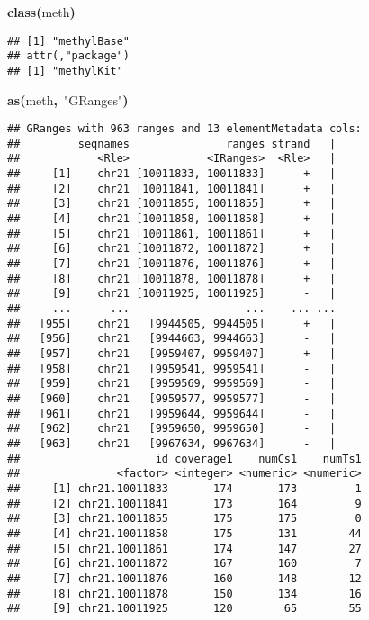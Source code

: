 \documentclass{article}
\makeatletter
\newcommand{\hlfunctioncall}[1]{\textcolor[rgb]{.5,0,.33}{\textbf{#1}}}%
\newcommand{\hlstring}[1]{\textcolor[rgb]{.6,.6,1}{#1}}%
\newcommand{\hlkeyword}[1]{\textbf{#1}}%
\newcommand{\hlsymbol}[1]{#1}%
\newenvironment{kframe}{%
 \def\FrameCommand##1{\hskip\@totalleftmargin \hskip-\fboxsep
 \colorbox{shadecolor}{##1}\hskip-\fboxsep
     \hskip-\linewidth \hskip-\@totalleftmargin \hskip\columnwidth}%
 \MakeFramed {\advance\hsize-\width
   \@totalleftmargin\z@ \linewidth\hsize
   \@setminipage}}%
 {\par\unskip\endMakeFramed}
\newenvironment{knitrout}{}{} %
\makeatother
\begin{document}
\begin{knitrout}
\color{fgcolor}\begin{kframe}
\begin{flushleft}
\ttfamily\noindent
\hlfunctioncall{class}\hlkeyword{(}\hlsymbol{meth}\hlkeyword{)}\mbox{}
\normalfont
\end{flushleft}
\begin{verbatim}
## [1] "methylBase"
## attr(,"package")
## [1] "methylKit"
\end{verbatim}
\begin{flushleft}
\ttfamily\noindent
\hlfunctioncall{as}\hlkeyword{(}\hlsymbol{meth}\hlkeyword{,}{\ }\hlstring{"{}GRanges"{}}\hlkeyword{)}\mbox{}
\normalfont
\end{flushleft}
\begin{verbatim}
## GRanges with 963 ranges and 13 elementMetadata cols:
##         seqnames               ranges strand   |
##            <Rle>            <IRanges>  <Rle>   |
##     [1]    chr21 [10011833, 10011833]      +   |
##     [2]    chr21 [10011841, 10011841]      +   |
##     [3]    chr21 [10011855, 10011855]      +   |
##     [4]    chr21 [10011858, 10011858]      +   |
##     [5]    chr21 [10011861, 10011861]      +   |
##     [6]    chr21 [10011872, 10011872]      +   |
##     [7]    chr21 [10011876, 10011876]      +   |
##     [8]    chr21 [10011878, 10011878]      +   |
##     [9]    chr21 [10011925, 10011925]      -   |
##     ...      ...                  ...    ... ...
##   [955]    chr21   [9944505, 9944505]      +   |
##   [956]    chr21   [9944663, 9944663]      -   |
##   [957]    chr21   [9959407, 9959407]      +   |
##   [958]    chr21   [9959541, 9959541]      -   |
##   [959]    chr21   [9959569, 9959569]      -   |
##   [960]    chr21   [9959577, 9959577]      -   |
##   [961]    chr21   [9959644, 9959644]      -   |
##   [962]    chr21   [9959650, 9959650]      -   |
##   [963]    chr21   [9967634, 9967634]      -   |
##                     id coverage1    numCs1    numTs1
##               <factor> <integer> <numeric> <numeric>
##     [1] chr21.10011833       174       173         1
##     [2] chr21.10011841       173       164         9
##     [3] chr21.10011855       175       175         0
##     [4] chr21.10011858       175       131        44
##     [5] chr21.10011861       174       147        27
##     [6] chr21.10011872       167       160         7
##     [7] chr21.10011876       160       148        12
##     [8] chr21.10011878       150       134        16
##     [9] chr21.10011925       120        65        55

\end{verbatim}
\end{kframe}
\end{knitrout}
\end{document}
